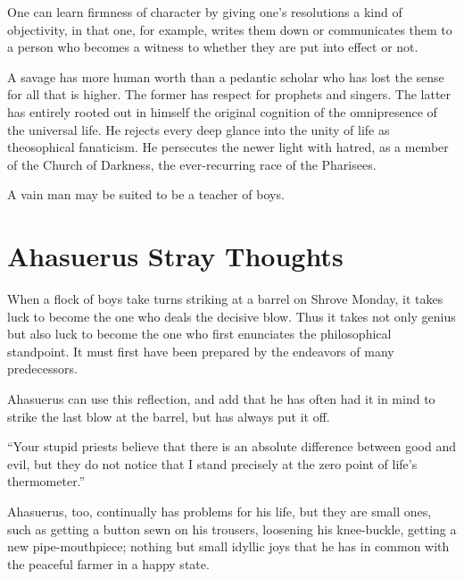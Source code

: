 \documentclass[12pt,a4paper]{article}
\newcommand{\aphsep}{\par\smallskip\centerline{\textasteriskcentered}\smallskip}
\begin{document}
\aphsep

One can learn firmness of character by giving one's resolutions a kind of
objectivity, in that one, for example, writes them down or communicates them to a
person who becomes a witness to whether they are put into effect or not.

\aphsep

A savage has more human worth than a pedantic scholar who has lost the sense for
all that is higher. The former has respect for prophets and singers. The latter
has entirely rooted out in himself the original cognition of the omnipresence of
the universal life. He rejects every deep glance into the unity of life as
theosophical fanaticism. He persecutes the newer light with hatred, as a member of
the Church of Darkness, the ever-recurring race of the Pharisees.

\aphsep

A vain man may be suited to be a teacher of boys.

\bigskip

\section*{Ahasuerus Stray Thoughts}
\label{ch:012}

When a flock of boys take turns striking at a barrel on Shrove Monday, it takes
luck to become the one who deals the decisive blow. Thus it takes not only genius
but also luck to become the one who first enunciates the philosophical standpoint.
It must first have been prepared by the endeavors of many predecessors.

\aphsep

Ahasuerus can use this reflection, and add that he has often had it in mind to
strike the last blow at the barrel, but has always put it off.

\aphsep

``Your stupid priests believe that there is an absolute difference between good and
evil, but they do not notice that I stand precisely at the zero point of life's
thermometer.''

\aphsep

Ahasuerus, too, continually has problems for his life, but they are small ones,
such as getting a button sewn on his trousers, loosening his knee-buckle, getting
a new pipe-mouthpiece; nothing but small idyllic joys that he has in common with
the peaceful farmer in a happy state.

\aphsep
\end{document}
